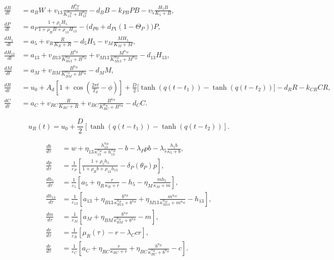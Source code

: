 \documentclass[11pt]{article}
\begin{document}
\begin{align*}
\frac{dB}{dt}
&=
a_BW
+
v_{13}\frac{H_{13}^{n_H}}{K_{13}^{n_H}+H_{13}^{n_H}}
-
d_BB
-
k_{PB}PB
-
v_5\frac{H_5B}{K_5+B},
\\[8pt]
\frac{dP}{dt}
&=
a_P
\frac{1+\rho_5H_5}
{1+\rho_BB+\rho_{13}H_{13}}
-
\Big(d_{P0}+d_{P1}(1-\Theta_P)\Big)P,
\\[8pt]
\frac{dH_5}{dt}
&=
a_5
+
v_R\frac{R}{K_R+R}
-
d_5H_5
-
v_M\frac{MH_5}{K_M+M},
\\[8pt]
\frac{dH_{13}}{dt}
&=
a_{13}
+
v_{B13}\frac{B^{n_B}}{K_{B13}^{n_B}+B^{n_B}}
+
v_{M13}\frac{M^{n_M}}{K_{M13}^{n_M}+M^{n_M}}
-
d_{13}H_{13},
\\[8pt]
\frac{dM}{dt}
&=
a_M
+
v_{BM}\frac{B^{n_B}}{K_{BM}^{n_B}+B^{n_B}}
-
d_MM,
\\[8pt]
\frac{dR}{dt}
&=
u_0
+
A_d
\left[
1+
\cos\left(
\frac{2\pi t}{T_d}-\phi
\right)
\right]
+
\frac{D}{2}
\bigg[
\tanh(q(t-t_1))
-
\tanh(q(t-t_2))
\bigg]
-
d_RR
-
k_{CR}CR,
\\[8pt]
\frac{dC}{dt}
&=
a_C
+
v_{RC}\frac{R}{K_{RC}+R}
+
v_{BC}\frac{B^{n_B}}{K_{BC}^{n_B}+B^{n_B}}
-
d_CC.
\end{align*}

\[
u_R(t)
=
u_0
+
\frac{D}{2}
\left[
\tanh(q(t-t_1))
-
\tanh(q(t-t_2))
\right].
\]


\begin{align*}
\frac{db}{d\tau}
&=
w
+
\eta_{13}\frac{h_{13}^{n_H}}{\kappa_{13}^{n_H}+h_{13}^{n_H}}
-
b
-
\lambda_Ppb
-
\lambda_5\frac{h_5b}{\kappa_5+b},
\\[8pt]
\frac{dp}{d\tau}
&=
\frac{1}{\varepsilon_P}
\left[
\frac{1+\rho_5h_5}
{1+\rho_Bb+\rho_{13}h_{13}}
-
\delta_P(\theta_P)p
\right],
\\[8pt]
\frac{dh_5}{d\tau}
&=
\frac{1}{\varepsilon_5}
\left[
a_5
+
\eta_R\frac{r}{\kappa_R+r}
-
h_5
-
\eta_M\frac{mh_5}{\kappa_M+m}
\right],
\\[8pt]
\frac{dh_{13}}{d\tau}
&=
\frac{1}{\varepsilon_{13}}
\left[
a_{13}
+
\eta_{B13}\frac{b^{n_B}}{\kappa_{B13}^{n_B}+b^{n_B}}
+
\eta_{M13}\frac{m^{n_M}}{\kappa_{M13}^{n_M}+m^{n_M}}
-
h_{13}
\right],
\\[8pt]
\frac{dm}{d\tau}
&=
\frac{1}{\varepsilon_M}
\left[
a_M
+
\eta_{BM}\frac{b^{n_B}}{\kappa_{BM}^{n_B}+b^{n_B}}
-
m
\right],
\\[8pt]
\frac{dr}{d\tau}
&=
\frac{1}{\varepsilon_R}
\left[
\mu_R(\tau)
-
r
-
\lambda_Ccr
\right],
\\[8pt]
\frac{dc}{d\tau}
&=
\frac{1}{\varepsilon_C}
\left[
a_C
+
\eta_{RC}\frac{r}{\kappa_{RC}+r}
+
\eta_{BC}\frac{b^{n_B}}{\kappa_{BC}^{n_B}+b^{n_B}}
-
c
\right].
\end{align*}
\end{document}
